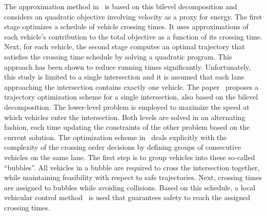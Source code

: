 \documentclass{article}
\theoremstyle{definition}
\theoremstyle{plain}
\begin{document}
The approximation method in~\cite{hultApproximateSolutionOptimal2015} is based
on this bilevel decomposition and considers an quadratic objective involving
velocity as a proxy for energy. The first stage optimizes a schedule of vehicle
crossing times. It uses approximations of each vehicle's contribution to the
total objective as a function of its crossing time. Next, for each vehicle, the
second stage computes an optimal trajectory that satisfies the crossing time
schedule by solving a quadratic program. This approach has been shown to reduce
running times significantly. Unfortunately, this study is limited to a single
intersection and it is assumed that each lane approaching the intersection
contains exactly one vehicle.
The paper~\cite{zhaoBilevelProgrammingModel2021} proposes a trajectory
optimization scheme for a single intersection, also based on the bilevel
decomposition. The lower-level problem is employed to maximize the speed at
which vehicles enter the intersection. Both levels are solved in an alternating
fashion, each time updating the constraints of the other problem based on the
current solution.
The optimization scheme
in~\cite{tallapragadaHierarchicaldistributedOptimizedCoordination2017} deals
explicitly with the complexity of the crossing order decisions by defining
groups of consecutive vehicles on the same lane. The first step is to group
vehicles into these so-called ``bubbles''. All vehicles in a bubble are required
to cross the intersection together, while maintaining feasibility with respect
to safe trajectories. Next, crossing times are assigned to bubbles while
avoiding collisions. Based on this schedule, a local vehicular control
method~\cite{tallapragadaDistributedControlVehicle2017} is used that guarantees
safety to reach the assigned crossing times.



\end{document}
